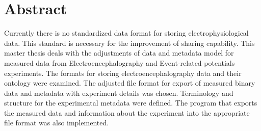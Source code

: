 \chapter* {Abstract}
\thispagestyle{empty}
Currently there is no standardized data format for storing electrophysiological data. This standard is necessary for the improvement of sharing capability. This master thesis deals with the adjustments of data and metadata model for measured data from Electroencephalography and Event-related potentials experiments. The formats for storing electroencephalography data and their ontology were examined. The adjusted file format for export of measured binary data and metadata with experiment details was chosen. Terminology and structure for the experimental metadata were defined. The program that exports the measured data and information about the experiment into the appropriate file format was also implemented. 
